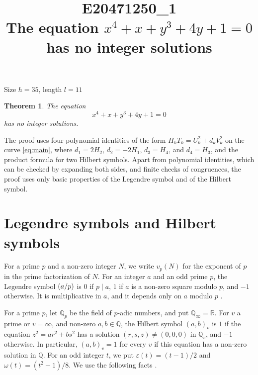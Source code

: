 \documentclass[11pt]{article}
\title{\textbf{E20471250\_1}\\[4pt] {\Large The equation $x^{4}+x+y^{3}+4y+1=0$ has no integer solutions}}
\author{}
\date{}
\newtheorem{theorem}{Theorem}
\newcommand{\Q}{\mathbb{Q}}
\newcommand{\leg}[2]{\mathchoice{\biggl(\dfrac{#1}{#2}\biggr)}{(#1/#2)}{(#1/#2)}{(#1/#2)}}
\begin{document}
\maketitle
\vspace{-8ex}
\begin{center}
Size $h=35$, length $l=11$
\end{center}

\begin{theorem}\label{thm:main}
The equation
\begin{equation}\label{eq:main}
x^{4}+x+y^{3}+4y+1=0
\end{equation}
has no integer solutions.
\end{theorem}

The proof uses four polynomial identities of the form $H_kT_k=U_k^2+d_kV_k^2$ on the curve \eqref{eq:main}, where $d_{1}=2H_{2}$, $d_{2}=-2H_{1}$, $d_{3}=H_{4}$, and $d_{4}=H_{3}$, and the product formula for two Hilbert symbols. Apart from polynomial identities, which can be checked by expanding both sides, and finite checks of congruences, the proof uses only basic properties of the Legendre symbol and of the Hilbert symbol.

\section{Legendre symbols and Hilbert symbols}

For a prime $p$ and a non-zero integer $N$, we write $v_p(N)$ for the exponent of $p$ in the prime factorization of $N$. For an integer $a$ and an odd prime $p$, the Legendre symbol $\leg{a}{p}$ is $0$ if $p\mid a$, $1$ if $a$ is a non-zero square modulo $p$, and $-1$ otherwise. It is multiplicative in $a$, and it depends only on $a$ modulo $p$ \cite[Chapter~5]{IR}.

For a prime $p$, let $\Q_p$ be the field of $p$-adic numbers, and put $\Q_\infty=\mathbb R$. For $v$ a prime or $v=\infty$, and non-zero $a,b\in\Q$, the Hilbert symbol $(a,b)_v$ is $1$ if the equation $z^2=ar^2+bs^2$ has a solution $(r,s,z)\neq(0,0,0)$ in $\Q_v$, and $-1$ otherwise. In particular, $(a,b)_v=1$ for every $v$ if this equation has a non-zero solution in $\Q$. For an odd integer $t$, we put $\varepsilon(t)=(t-1)/2$ and $\omega(t)=(t^2-1)/8$. We use the following facts \cite[Chapter~III, Proposition~2 and Theorems~1 and~3]{Se}.
\end{document}
